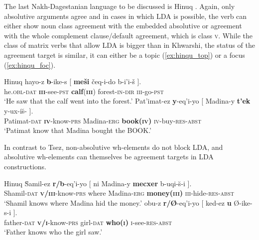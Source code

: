 \documentclass[output=paper
,modfonts
,nonflat]{langsci/langscibook}
\begin{document}
The last Nakh-Dagestanian language to be discussed is Hinuq \citep{Forker2012}. Again, only absolutive arguments agree and in cases in which LDA is possible, the verb can either show noun class agreement with the embedded absolutive or agreement with the whole complement clause/default agreement, which is class \textsc{v}. While the class of matrix verbs that allow LDA is bigger than in Khwarshi, the status of the agreement target is similar, it can either be a topic (\ref{ex:hinqu_top}) or a focus (\ref{ex:hinqu_foc}).
\begin{exe}
\ex Hinuq \citep[][628]{Forker2012}
	\xlist
	\ex \label{ex:hinqu_top}
		\gll hay\textipa{\textbeltl}o-z \textbf{b}-ike-s [ \textbf{me\v{s}i} \v{c}eq-i-do b-i'i-\v{s} ].\\
			 he.\textsc{obl}-\textsc{dat} \textbf{\textsc{iii}}-see-\textsc{pst} {} \textbf{calf}(\textbf{\textsc{iii}}) forest-\textsc{in}-\textsc{dir} \textsc{iii}-go-\textsc{pst}\\
		\glt `He saw that the calf went into the forest.' 
	\ex  \label{ex:hinqu_foc}
		\gll Pat'imat-ez \textbf{y}-eq'i-yo [ Madina-y \textbf{t'ek} y-ux-i\u{s}-\textipa{\textbeltl} ].\\
			 Patimat-\textsc{dat} \textbf{\textsc{iv}}-know-\textsc{prs} {} Madina-\textsc{erg} \textbf{book(\textsc{iv})} \textsc{iv}-buy-\textsc{res-abst}\\
		\glt `Patimat know that Madina bought the BOOK.'
	\endxlist
\end{exe}
In contrast to Tsez, non-absolutive wh-elements do not block LDA, and absolutive wh-elements can themselves be agreement targets in LDA constructions.
\begin{exe}
\ex Hinuq \citep[][637]{Forker2012}
	\xlist
	\ex
		\gll \u{S}amil-ez \textbf{r/b}-eq'i-yo [ ni Madina-y \textbf{mecxer} b-uqi-\u{s}-\textipa{\textbeltl}i ].\\
			 Shamil-\textsc{dat} \textbf{\textsc{v/iii}}-know-\textsc{prs} {} where Madina-\textsc{erg} \textbf{money(\textsc{iii})} \textsc{iii}-hide-\textsc{res-abst}\\
		\glt `Shamil knows where Madina hid the money.'
	\ex 
		\gll obu-z \textbf{r/\O{}}-eq'i-yo [ ked-ez \textbf{\textipa{\textbeltl}u} \O{}-ike-s-\textipa{\textbeltl}i ].\\
			 father-\textsc{dat} \textbf{\textsc{v/i}}-know-\textsc{prs} {} girl-\textsc{dat} \textbf{who(\textsc{i})} \textsc{i}-see-\textsc{res-abst}\\
		\glt `Father knows who the girl saw.'
	\endxlist
\end{exe}
\end{document}
